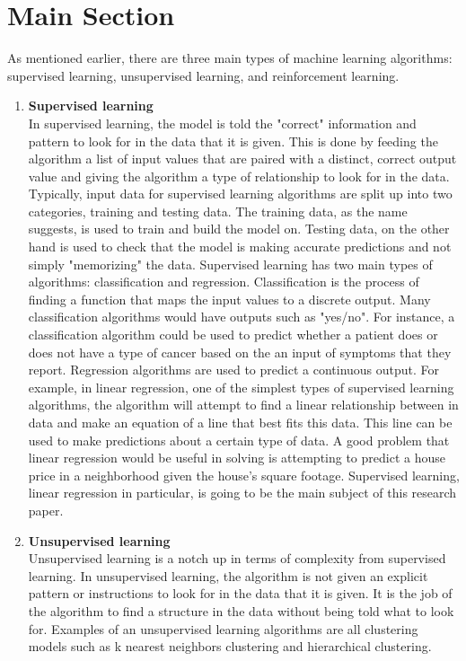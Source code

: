 \documentclass[11pt]{article}
\begin{document}
\section{Main Section}
As mentioned earlier, there are three main types of machine learning algorithms: supervised learning, unsupervised learning, and reinforcement learning.
\begin{enumerate}
    \item \textbf{Supervised learning}\\
    In supervised learning, the model is told the "correct" information and pattern to look for in the data that it is given. This is done by feeding the algorithm a list of input values that are paired with a distinct, correct output value and giving the algorithm a type of relationship to look for in the data. Typically, input data for supervised learning algorithms are split up into two categories, training and testing data. The training data, as the name suggests, is used to train and build the model on. Testing data, on the other hand is used to check that the model is making accurate predictions and not simply "memorizing" the data. Supervised learning has two main types of algorithms: classification and regression. Classification is the process of finding a function that maps the input values to a discrete output. Many classification algorithms would have outputs such as "yes/no". For instance, a classification algorithm could be used to predict whether a patient does or does not have a type of cancer based on the an input of symptoms that they report. Regression algorithms are used to predict a continuous output. For example, in linear regression, one of the simplest types of supervised learning algorithms, the algorithm will attempt to find a linear relationship  between in data and make an equation of a line that best fits this data. This line can be used to make predictions about a certain type of data. A good problem that linear regression would be useful in solving is attempting to predict a house price in a neighborhood given the house's square footage. Supervised learning, linear regression in particular, is going to be the main subject of this research paper.
    \item \textbf{Unsupervised learning}\\
    Unsupervised learning is a notch up in terms of complexity from supervised learning. In unsupervised learning, the algorithm is not given an explicit pattern or instructions to look for in the data that it is given. It is the job of the algorithm to find a structure in the data without being told what to look for. Examples of an unsupervised learning algorithms are all clustering models such as k nearest neighbors clustering and hierarchical clustering.

\end{enumerate}
\end{document}
